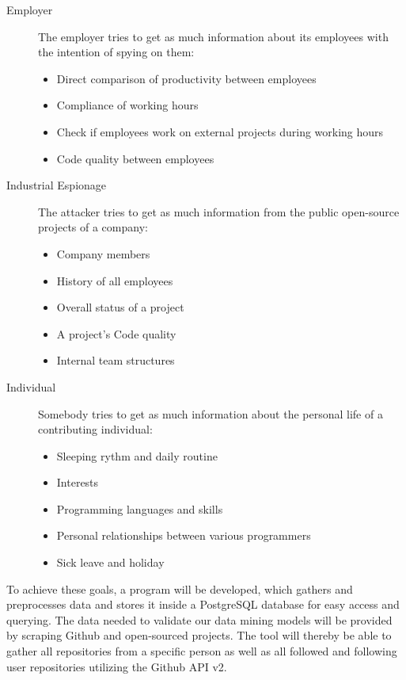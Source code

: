 \documentclass[
  twoside,
  11pt, a4paper,
  footinclude=true,
  headinclude=true,
  cleardoublepage=empty
]{scrreprt}
\begin{document}
\begin{description}
    \item[Employer]
        The employer tries to get as much information about its employees with the intention of spying on them:
        \begin{itemize}
            \item Direct comparison of productivity between employees
            \item Compliance of working hours
            \item Check if employees work on external projects during working hours
            \item Code quality between employees
        \end{itemize}

    \item[Industrial Espionage]
        The attacker tries to get as much information from the public open-source projects of a company:
        \begin{itemize}
            \item Company members
            \item History of all employees
            \item Overall status of a project
            \item A project's Code quality
            \item Internal team structures
        \end{itemize}

    \item[Individual]
        Somebody tries to get as much information about the personal life of a contributing individual:
        \begin{itemize}
            \item Sleeping rythm and daily routine
            \item Interests
            \item Programming languages and skills
            \item Personal relationships between various programmers
            \item Sick leave and holiday
        \end{itemize}

\end{description}

To achieve these goals, a program will be developed, which gathers and preprocesses data and stores it inside a PostgreSQL database for easy access and querying.
The data needed to validate our data mining models will be provided by scraping Github and open-sourced projects.
The tool will thereby be able to gather all repositories from a specific person as well as all followed and following user repositories utilizing the Github API v2.
\end{document}
